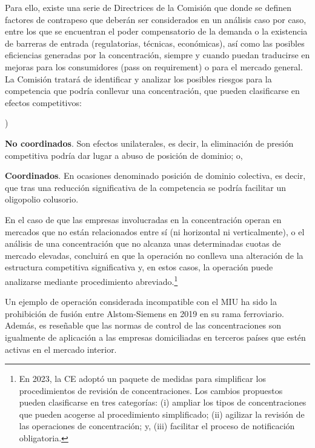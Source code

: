 \documentclass[10pt,a4paper]{article}
\newcounter{alphaitem}
\newenvironment{la}
      {\begin{list}{\alph{alphaitem})}{%
          \usecounter{alphaitem}%
          \setlength{\leftmargin}{1cm}%
          \setlength{\parskip}{3pt}%
          \setlength{\itemsep}{0pt}%
          \setlength{\parsep}{0pt}%
      }}
      {\end{list}}
\begin{document}
Para ello, existe una serie de Directrices de la Comisión que donde se definen factores de contrapeso que deberán ser considerados en un análisis caso por caso, entre los que se encuentran el poder compensatorio de la demanda o la existencia de barreras de entrada (regulatorias, técnicas, económicas), así como las posibles eficiencias generadas por la concentración, siempre y cuando puedan traducirse en mejoras para los consumidores (pass on requirement) o para el mercado general. La Comisión tratará de identificar y analizar los posibles riesgos para la competencia que podría conllevar una concentración, que pueden clasificarse en efectos competitivos:
\begin{la}
    \item \textbf{No coordinados}. Son efectos unilaterales, es decir, la eliminación de presión competitiva podría dar lugar a abuso de posición de dominio; o,
    \item \textbf{Coordinados}. En ocasiones denominado posición de dominio colectiva, es decir, que tras una reducción significativa de la competencia se podría facilitar un oligopolio colusorio.
\end{la}

En el caso de que las empresas involucradas en la concentración operan en mercados que no están relacionados entre sí (ni horizontal ni verticalmente), o el análisis de una concentración que no alcanza unas determinadas cuotas de mercado elevadas, concluirá en que la operación no conlleva una alteración de la estructura competitiva significativa y, en estos casos, la operación puede analizarse mediante procedimiento abreviado.\footnote{%
    En 2023, la CE adoptó un paquete de medidas para simplificar los procedimientos de revisión de concentraciones. Los cambios propuestos pueden clasificarse en tres categorías: (i) ampliar los tipos de concentraciones que pueden acogerse al procedimiento simplificado; (ii) agilizar la revisión de las operaciones de concentración; y, (iii) facilitar el proceso de notificación obligatoria.
}

Un ejemplo de operación considerada incompatible con el MIU ha sido la prohibición de fusión entre Alstom-Siemens en 2019 en su rama ferroviario. Además, es reseñable que las normas de control de las concentraciones son igualmente de aplicación a las empresas domiciliadas en terceros países que estén activas en el mercado interior.
\end{document}
